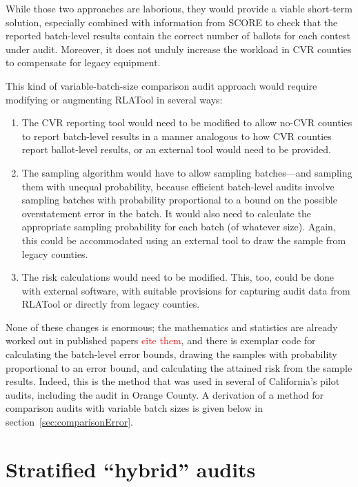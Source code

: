 \documentclass[12pt]{article}
\newcommand{\note}[1]{\textcolor{red}{\sc #1}}
\begin{document}
While those two approaches are laborious, they would provide a viable short-term solution,
especially combined with information from SCORE to check that the reported batch-level results contain the correct number of ballots for each contest under audit.
Moreover, it does not unduly increase the workload in CVR counties
to compensate for legacy equipment.

This kind of variable-batch-size comparison audit approach would require modifying or augmenting
RLATool in several ways: 

\begin{enumerate}

  \item The CVR reporting tool would need to be modified to allow no-CVR counties to
report batch-level results in a manner analogous to how CVR counties report
ballot-level results, or an external tool would need to be provided.

  \item The sampling
algorithm would have to allow sampling batches---and sampling them with unequal probability,
because efficient batch-level audits involve sampling batches with probability proportional
to a bound on the possible overstatement error in the batch.
It would also need to calculate the appropriate sampling probability for each batch (of whatever size).
Again, this could be accommodated using an external tool to draw the sample from legacy counties.

  \item The risk calculations would need to be modified. 
This, too, could be done with external software, with suitable provisions for capturing audit data
from RLATool or directly from legacy counties.
\end{enumerate}

None of these changes is enormous; the mathematics and statistics are already worked out
in published papers \note{cite them}, and there is exemplar code for calculating the
batch-level error bounds, drawing the samples with probability proportional to an
error bound, and calculating the attained risk from the sample results.
Indeed, this is the method that was used in several of California's pilot audits,
including the audit in Orange County.
A derivation of a method for comparison audits with variable batch sizes is given below
in section~\ref{sec:comparisonError}.

\section{Stratified ``hybrid'' audits} \label{sec:hybrid}
\end{document}
